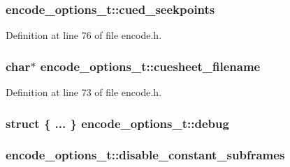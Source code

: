 \subsubsection[{\texorpdfstring{cued\+\_\+seekpoints}{cued_seekpoints}}]{ encode\+\_\+options\+\_\+t\+::cued\+\_\+seekpoints}\hypertarget{structencode__options__t_af48dd92ab1a18d1a62006e63ffc44b7d}{}\label{structencode__options__t_af48dd92ab1a18d1a62006e63ffc44b7d}


Definition at line 76 of file encode.\+h.

\subsubsection[{\texorpdfstring{cuesheet\+\_\+filename}{cuesheet_filename}}]{ char$\ast$ encode\+\_\+options\+\_\+t\+::cuesheet\+\_\+filename}\hypertarget{structencode__options__t_ac37d1b3f6a4fdad4cc53a4a1faf6a05b}{}\label{structencode__options__t_ac37d1b3f6a4fdad4cc53a4a1faf6a05b}


Definition at line 73 of file encode.\+h.

\subsubsection[{\texorpdfstring{debug}{debug}}]{\setlength{\rightskip}{0pt plus 5cm}struct \{ ... \}   encode\+\_\+options\+\_\+t\+::debug}\hypertarget{structencode__options__t_a78afb4750fece5fcfbfaccc52cf7c5f6}{}\label{structencode__options__t_a78afb4750fece5fcfbfaccc52cf7c5f6}
\subsubsection[{\texorpdfstring{disable\+\_\+constant\+\_\+subframes}{disable_constant_subframes}}]{ encode\+\_\+options\+\_\+t\+::disable\+\_\+constant\+\_\+subframes}\hypertarget{structencode__options__t_a955683a6508f2146c51761f3fb4e8330}{}\label{structencode__options__t_a955683a6508f2146c51761f3fb4e8330}


